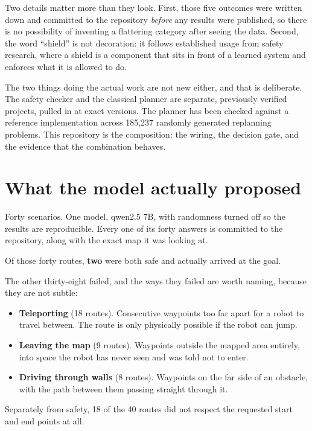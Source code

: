 \documentclass[11pt,a4paper]{article}
\begin{document}
Two details matter more than they look. First, those five outcomes were written down and committed to the repository \emph{before} any results were published, so there is no possibility of inventing a flattering category after seeing the data. Second, the word ``shield'' is not decoration: it follows established usage from safety research, where a shield is a component that sits in front of a learned system and enforces what it is allowed to do.

The two things doing the actual work are not new either, and that is deliberate. The safety checker and the classical planner are separate, previously verified projects, pulled in at exact versions. The planner has been checked against a reference implementation across 185,237 randomly generated replanning problems. This repository is the composition: the wiring, the decision gate, and the evidence that the combination behaves.

\section{What the model actually proposed}

Forty scenarios. One model, qwen2.5 7B, with randomness turned off so the results are reproducible. Every one of its forty answers is committed to the repository, along with the exact map it was looking at.

Of those forty routes, \textbf{two} were both safe and actually arrived at the goal.

The other thirty-eight failed, and the ways they failed are worth naming, because they are not subtle:

\begin{itemize}[leftmargin=1.4em,itemsep=2pt]
\item \textbf{Teleporting} (18 routes). Consecutive waypoints too far apart for a robot to travel between. The route is only physically possible if the robot can jump.
\item \textbf{Leaving the map} (9 routes). Waypoints outside the mapped area entirely, into space the robot has never seen and was told not to enter.
\item \textbf{Driving through walls} (8 routes). Waypoints on the far side of an obstacle, with the path between them passing straight through it.
\end{itemize}

Separately from safety, 18 of the 40 routes did not respect the requested start and end points at all.
\end{document}
